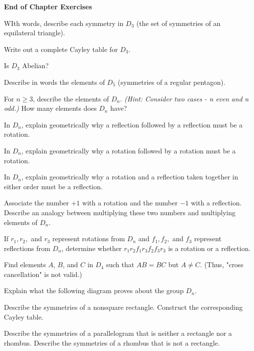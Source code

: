 \documentclass[11pt,largemargins]{homework}
\begin{document}
\maketitle


\textbf{\large{End of Chapter Exercises}}

\question
WIth words, describe each symmetry in $D_3$ (the set of symmetries of an equilateral triangle).


\question 
Write out a complete Cayley table for $D_3$. 


\question 
Is $D_3$ Abelian?


\question 
Describe in words the elements of $D_5$ (symmetries of a regular pentagon).


\question 
For $n\geq 3$, describe the elements of $D_n$. \textit{(Hint: Consider two cases - n even and n odd.)} 
How many elements does $D_n$ have?


\question 
In $D_n$, explain geometrically why a reflection followed by a reflection must be a rotation.


\question 
In $D_n$, explain geometrically why a rotation followed by a rotation must be a rotation.


\question 
In $D_n$, explain geometrically why a rotation and a reflection taken together in either order must be a reflection.


\question 
Associate the number $+1$ with a rotation and the number $-1$ with a reflection. Describe an analogy between 
multiplying these two numbers and multiplying elements of $D_n$.


\question 
If $r_1,r_2,$ and $r_3$ represent rotations from $D_n$ and $f_1,f_2,$ and $f_3$ represent reflections from $D_n$, 
determine whether $r_1r_2f_1r_3f_2f_3r_3$ is a rotation or a reflection.



\question 
Find elements $A$, $B$, and $C$ in $D_4$ such that $AB=BC$ but $A\neq C$. (Thus, "cross cancellation" is not valid.)


\question 
Explain what the following diagram proves about the group $D_n$.


\question 
Describe the symmetries of a nonsquare rectangle. Construct the corresponding Cayley table.


\question 
Describe the symmetries of a parallelogram that is neither a rectangle nor a rhombus. Describe the symmetries of 
a rhombus that is not a rectangle.
\end{document}
